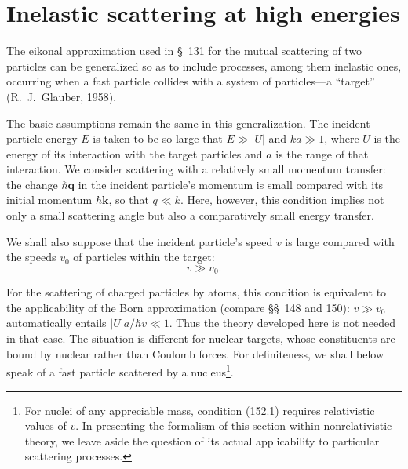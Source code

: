 \section{Inelastic scattering at high energies}

The eikonal approximation used in §~131 for the mutual scattering of two particles can be generalized so as to include processes, among them inelastic ones, occurring when a fast particle collides with a system of particles---a ``target'' (R.~J.~Glauber, 1958).

The basic assumptions remain the same in this generalization. The incident-particle energy $E$ is taken to be so large that $E\gg|U|$ and $ka\gg1$, where $U$ is the energy of its interaction with the target particles and $a$ is the range of that interaction. We consider scattering with a relatively small momentum transfer: the change $\hbar\mathbf q$ in the incident particle's momentum is small compared with its initial momentum $\hbar\mathbf k$, so that $q\ll k$. Here, however, this condition implies not only a small scattering angle but also a comparatively small energy transfer.

We shall also suppose that the incident particle's speed $v$ is large compared with the speeds $v_0$ of particles within the target:
\begin{equation}
 v\gg v_0.
 \tag{152.1}
\end{equation}

For the scattering of charged particles by atoms, this condition is equivalent to the applicability of the Born approximation (compare §§~148 and 150): $v\gg v_0$ automatically entails $|U|a/\hbar v\ll1$. Thus the theory developed here is not needed in that case. The situation is different for nuclear targets, whose constituents are bound by nuclear rather than Coulomb forces. For definiteness, we shall below speak of a fast particle scattered by a nucleus\footnote{For nuclei of any appreciable mass, condition (152.1) requires relativistic values of $v$. In presenting the formalism of this section within nonrelativistic theory, we leave aside the question of its actual applicability to particular scattering processes.}.


